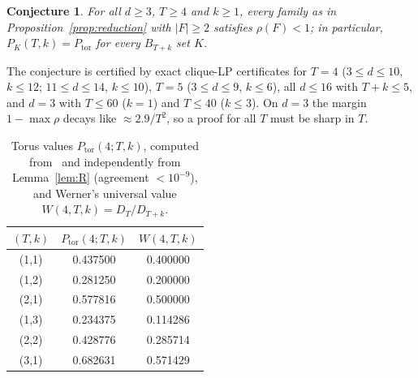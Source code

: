 \documentclass[11pt]{article}
\newcommand{\Ptor}{P_{\mathrm{tor}}}
\newtheorem{conjecture}[theorem]{Conjecture}
\theoremstyle{definition}
\theoremstyle{remark}
\begin{document}
\begin{conjecture}\label{conj:TT}
For all $d\ge3$, $T\ge4$ and $k\ge1$, every family as in Proposition~\ref{prop:reduction} with $|F|\ge2$ satisfies $\rho(F)<1$;
in particular, $P_K(T,k)=\Ptor$ for every $B_{T+k}$ set $K$.
\end{conjecture}
The conjecture is certified by exact clique-LP certificates for $T=4$ ($3\le d\le10$, $k\le12$; $11\le d\le14$, $k\le10$), $T=5$
($3\le d\le9$, $k\le6$), all $d\le16$ with $T+k\le5$, and $d=3$ with $T\le60$ ($k=1$) and $T\le40$ ($k\le3$). On $d=3$ the margin
$1-\max\rho$ decays like $\approx2.9/T^2$, so a proof for all $T$ must be sharp in $T$.

\begin{table}[t]\centering
\caption{Torus values $\Ptor(4;T,k)$, computed from~\cite[Eq.~(16)]{Herasymenko2026} and independently from Lemma~\ref{lem:R}
(agreement $<10^{-9}$), and Werner's universal value $W(4,T,k)=D_T/D_{T+k}$.}\label{tab:torus}
\begin{tabular}{ccc}\toprule
$(T,k)$ & $\Ptor(4;T,k)$ & $W(4,T,k)$\\\midrule
(1,1)&0.437500&0.400000\\
(1,2)&0.281250&0.200000\\
(2,1)&0.577816&0.500000\\
(1,3)&0.234375&0.114286\\
(2,2)&0.428776&0.285714\\
(3,1)&0.682631&0.571429\\\bottomrule
\end{tabular}
\end{table}
\end{document}
